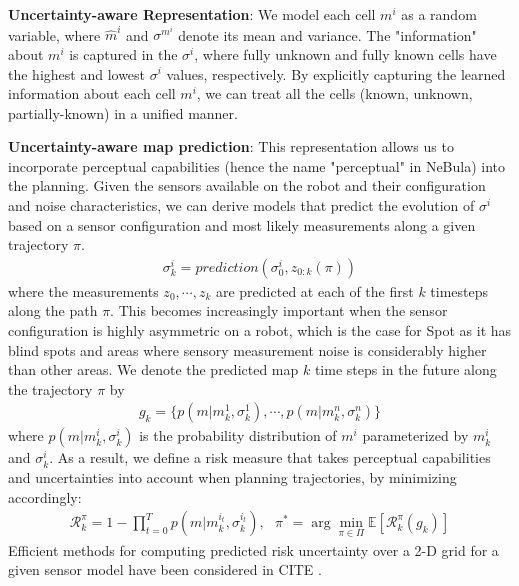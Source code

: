 \documentclass[a4paper, 10pt, conference]{ieeeconf}      %
\newcommand{\ph}[1]{{\textbf{#1}:}} %
\newcommand{\todo}[1]{{\color{red} #1 }} %
\begin{document}
\ph{Uncertainty-aware Representation}
We model each cell $m^i$ as a random variable, where $\hat{m}^i$ and $\sigma^{m^i}$ denote its mean and variance. The "information" about $m^i$ is captured in the $\sigma^i$, where fully unknown and fully known cells have the highest and lowest $\sigma^i$ values, respectively.  By explicitly capturing the learned information about each cell $m^i$, we can treat all the cells (known, unknown, partially-known) in a unified manner. 

\ph{Uncertainty-aware map prediction}
This representation allows us to incorporate perceptual capabilities (hence the name "perceptual" in NeBula) into the planning. Given the sensors available on the robot and their configuration and noise characteristics, we can derive models that predict the evolution of $\sigma^i$ based on a sensor configuration and most likely measurements along a given trajectory $\pi$. 
\begin{align}
 \sigma^i_k = prediction( \sigma^i_0, z_{0:k}(\pi) )
\end{align}
where the measurements $z_0,\cdots,z_k$ are predicted at each of the first $k$ timesteps along the path $\pi$.
This becomes increasingly important when the sensor configuration is highly asymmetric on a robot, which is the case for Spot as it has blind spots and areas where sensory measurement noise is considerably higher than other areas.  We denote the predicted map $k$ time steps in the future along the trajectory $\pi$ by 
\begin{align}
 g_k = \{p(m|m^1_k,\sigma^1_k),\cdots,p(m|m^n_k,\sigma^n_k)\}   
\end{align}
where $p(m|m^i_k,\sigma^i_k)$ is the probability distribution of $m^i$ parameterized by $m^i_k$ and $\sigma^i_k$.
As a result, we define a risk measure that takes perceptual capabilities and uncertainties into account when planning trajectories, by minimizing accordingly:
\begin{align}
 \mathcal{R}_k^{\pi}=1-\prod_{t=0}^Tp(m|m_k^{i_t},\sigma_k^{i_t}),~~~
    \pi^* = \arg\min_{\pi\in\Pi}\mathbb{E}[\mathcal{R}_k^{\pi}(g_k)]
\end{align}
Efficient methods for computing predicted risk uncertainty over a 2-D grid for a given sensor model have been considered in \todo{CITE}.
\end{document}
